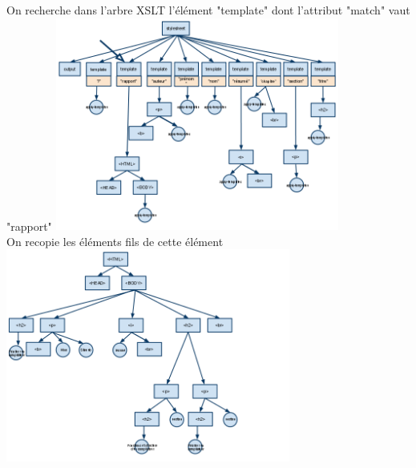 	On recherche dans l'arbre XSLT l'élément "template" dont l'attribut "match" vaut "rapport"
	\includegraphics[width=0.7\textwidth]{img/XSLTa}\\
	On recopie les éléments fils de cette élément 
	\includegraphics[width=0.7\textwidth]{img/ArbreHTML}\\
